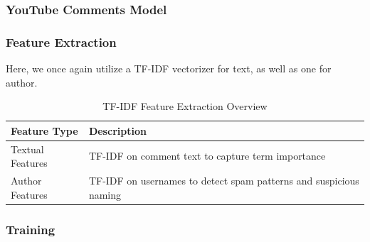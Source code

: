 \documentclass{article}
\begin{document}


\subsubsection{YouTube Comments Model}
\subsubsection*{Feature Extraction}

Here, we once again utilize a TF-IDF vectorizer for text, as well as one for author.

\begin{table}[H]
\renewcommand{\arraystretch}{1.3}
\setlength{\tabcolsep}{10pt}
\centering
\begin{tabular}{|p{5cm}|p{9cm}|}
\hline
\textbf{Feature Type} & \textbf{Description} \\
\hline
Textual Features & TF-IDF on comment text to capture term importance \\
\hline
Author Features & TF-IDF on usernames to detect spam patterns and suspicious naming \\
\hline
\end{tabular}
\caption{TF-IDF Feature Extraction Overview}
\label{tab:tfidf_features}
\end{table}

\subsubsection*{Training}
\end{document}
